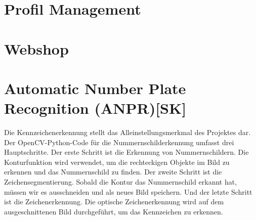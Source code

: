 \section{Profil Management}
\section{Webshop}
\section{Automatic Number Plate Recognition (ANPR)[SK]}
\label{lsg:def:anpr}
Die Kennzeichenerkennung stellt das Alleinstellungsmerkmal des Projektes dar. Der OpenCV-Python-Code für die Nummernschilderkennung umfasst drei Hauptschritte. Der erste Schritt ist die Erkennung von Nummernschildern. Die Konturfunktion wird verwendet, um die rechteckigen Objekte im Bild zu erkennen und das Nummernschild zu finden. Der zweite Schritt ist die Zeichensegmentierung. Sobald die Kontur das Nummernschild erkannt hat, müssen wir es ausschneiden und als neues Bild speichern. Und der letzte Schritt ist die Zeichenerkennung. Die optische Zeichenerkennung wird auf dem ausgeschnittenen Bild durchgeführt, um das Kennzeichen zu erkennen.

